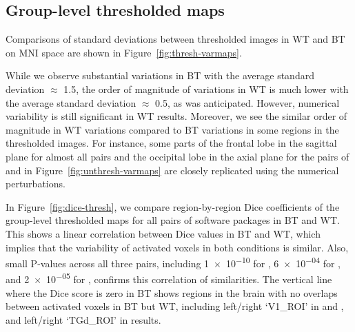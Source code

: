 \documentclass[conference]{IEEEtran}
\begin{document}
\subsection{Group-level thresholded maps}

Comparisons of standard deviations between thresholded images in WT and BT
on MNI space are shown in Figure~\ref{fig:thresh-varmaps}.

While we observe substantial variations in BT with the average standard deviation $\approx$ 1.5,
the order of magnitude of variations in WT is much lower with the average standard deviation $\approx$ 0.5,
as was anticipated. However, numerical variability is still significant in WT results.
Moreover, we see the similar order of magnitude in WT variations compared to BT variations
in some regions in the thresholded images.
For instance, some parts of the frontal lobe in the sagittal plane for almost all pairs and the occipital lobe in the axial plane
for the pairs of \fslspm and \fslafni in Figure~\ref{fig:unthresh-varmaps}
are closely replicated using the numerical perturbations. 

In Figure~\ref{fig:dice-thresh}, we compare region-by-region Dice coefficients of
the group-level thresholded maps for all pairs of software packages in BT and WT.
This shows a linear correlation between Dice values in BT and WT,
which implies that the variability of activated voxels in both conditions is similar.
Also, small P-values across all three pairs, including \num{1e-10} for \fslafni, \num{6e-04} for \fslspm,
and \num{2e-05} for \afnispm, confirms this correlation of similarities.
The vertical line where the Dice score is zero in BT shows regions in the brain with no overlaps between activated voxels in BT but WT,
including left/right `V1\_ROI' in \fslafni and \fslspm, and left/right `TGd\_ROI' in \afnispm results.
\end{document}

